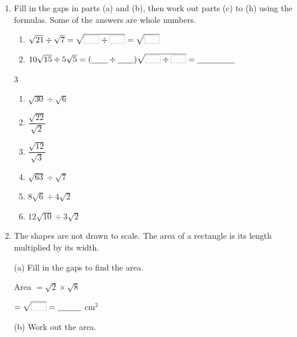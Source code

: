 \documentclass[12pt,a4paper]{article}
\newcommand{\ansline}[1][2.2cm]{\underline{\hspace{#1}}}
\newcommand{\gap}{\underline{\hspace{0.7cm}}}
\newcommand{\rootgap}{\tikz[baseline=0pt]\draw[gray!60,densely dotted,thick]
  (0,-0.12em) rectangle (1.8em,0.83em);}
\begin{document}
\begin{enumerate}[resume]

\item Fill in the gaps in parts (a) and (b), then work out parts (c) to (h)
using the formulas. Some of the answers are whole numbers.
\begin{enumerate}
  \item $\sqrt{21}\div\sqrt{7}=\sqrt{\rootgap\div\rootgap}=\sqrt{\rootgap}$
  \item $10\sqrt{15}\div5\sqrt{5}=(\gap\div\gap)\sqrt{\rootgap\div\rootgap}
        =\ansline[1.6cm]$
\end{enumerate}
\vspace{4pt}
\begin{multicols}{3}
\begin{enumerate}[resume]
  \item $\sqrt{30}\div\sqrt{6}$
  \item $\dfrac{\sqrt{22}}{\sqrt{2}}$
  \item $\dfrac{\sqrt{12}}{\sqrt{3}}$
  \item $\sqrt{63}\div\sqrt{7}$
  \item $8\sqrt{6}\div4\sqrt{2}$
  \item $12\sqrt{10}\div3\sqrt{2}$
\end{enumerate}
\end{multicols}
\vspace{10em}

\item The shapes are not drawn to scale. The area of a rectangle is its length
multiplied by its width.
\vspace{4pt}

\begin{minipage}[t]{0.32\linewidth}
(a) Fill in the gaps to find the area.

\vspace{4pt}
\centering
{}

\vspace{8pt}
\raggedright
Area $=\sqrt{2}\times\sqrt{8}$

\vspace{8pt}
\hspace*{2.4em}$=\sqrt{\rootgap}=\ansline[1cm]$ cm$^2$
\end{minipage}\hfill
\begin{minipage}[t]{0.32\linewidth}
(b) Work out the area.


\end{minipage}
\end{enumerate}
\end{document}
